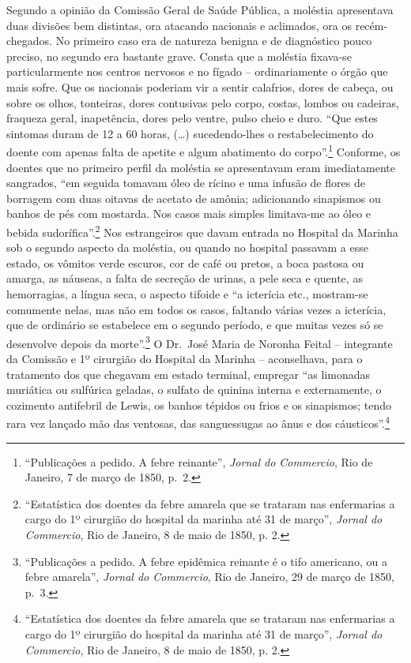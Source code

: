 Segundo a opinião da Comissão Geral de Saúde Pública, a moléstia
apresentava duas divisões bem distintas, ora atacando nacionais e
aclimados, ora os recém-chegados. No primeiro caso era de natureza
benigna e de diagnóstico pouco preciso, no segundo era bastante grave.
Consta que a moléstia fixava-se particularmente nos centros nervosos e
no fígado -- ordinariamente o órgão que mais sofre. Que os nacionais
poderiam vir a sentir calafrios, dores de cabeça, ou sobre os olhos,
tonteiras, dores contusivas pelo corpo, costas, lombos ou cadeiras,
fraqueza geral, inapetência, dores pelo ventre, pulso cheio e duro.
``Que estes sintomas duram de 12 a 60 horas, (\ldots{}) sucedendo-lhes o
restabelecimento do doente com apenas falta de apetite e algum
abatimento do corpo''.\footnote{``Publicações a pedido. A febre
  reinante'', \emph{Jornal do Commercio}, Rio de Janeiro, 7 de março de
  1850, p.~2.} Conforme, os doentes que no primeiro perfil da moléstia
se apresentavam eram imediatamente sangrados, ``em seguida tomavam óleo
de rícino e uma infusão de flores de borragem com duas oitavas de
acetato de amônia; adicionando sinapismos ou banhos de pés com mostarda.
Nos casos mais simples limitava-me ao óleo e bebida
sudorífica''.\footnote{``Estatística dos doentes da febre amarela que se
  trataram nas enfermarias a cargo do 1º cirurgião do hospital da
  marinha até 31 de março'', \emph{Jornal do Commercio}, Rio de Janeiro,
  8 de maio de 1850, p. 2.} Nos estrangeiros que davam entrada no
Hospital da Marinha sob o segundo aspecto da moléstia, ou quando no
hospital passavam a esse estado, os vômitos verde escuros, cor de café
ou pretos, a boca pastosa ou amarga, as náuseas, a falta de secreção de
urinas, a pele seca e quente, as hemorragias, a língua seca, o aspecto
tifoide e ``a icterícia etc., mostram-se comumente nelas, mas não em
todos os casos, faltando várias vezes a icterícia, que de ordinário se
estabelece em o segundo período, e que muitas vezes só se desenvolve
depois da morte''.\footnote{``Publicações a pedido. A febre epidêmica
  reinante é o tifo americano, ou a febre amarela'', \emph{Jornal do
  Commercio}, Rio de Janeiro, 29 de março de 1850, p.~3.} O Dr.~José
Maria de Noronha Feital -- integrante da Comissão e 1º cirurgião do
Hospital da Marinha -- aconselhava, para o tratamento dos que chegavam
em estado terminal, empregar ``as limonadas muriática ou sulfúrica
geladas, o sulfato de quinina interna e externamente, o cozimento
antifebril de Lewis, os banhos tépidos ou frios e os sinapismos; tendo
rara vez lançado mão das ventosas, das sanguessugas ao ânus e dos
cáusticos''.\footnote{``Estatística dos doentes da febre amarela que se
  trataram nas enfermarias a cargo do 1º cirurgião do hospital da
  marinha até 31 de março'', \emph{Jornal do Commercio}, Rio de Janeiro,
  8 de maio de 1850, p. 2.}

